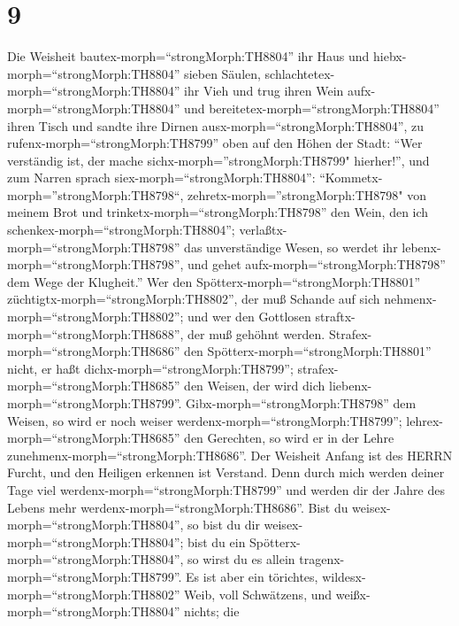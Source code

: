 \hypertarget{section-8}{%
\section{9}\label{section-8}}

 Die Weisheit bautex-morph=``strongMorph:TH8804'' ihr Haus
und hiebx-morph=``strongMorph:TH8804'' sieben Säulen, 
schlachtetex-morph=``strongMorph:TH8804'' ihr Vieh und trug ihren Wein
aufx-morph=``strongMorph:TH8804'' und
bereitetex-morph=``strongMorph:TH8804'' ihren Tisch  und
sandte ihre Dirnen ausx-morph=``strongMorph:TH8804'', zu
rufenx-morph=``strongMorph:TH8799'' oben auf den Höhen der Stadt:
 ``Wer verständig ist, der mache
sichx-morph=''strongMorph:TH8799" hierher!'', und zum Narren sprach
siex-morph=``strongMorph:TH8804'': 
``Kommetx-morph=''strongMorph:TH8798``,
zehretx-morph=''strongMorph:TH8798" von meinem Brot und
trinketx-morph=``strongMorph:TH8798'' den Wein, den ich
schenkex-morph=``strongMorph:TH8804''; 
verlaßtx-morph=``strongMorph:TH8798'' das unverständige Wesen, so werdet
ihr lebenx-morph=``strongMorph:TH8798'', und gehet
aufx-morph=``strongMorph:TH8798'' dem Wege der Klugheit.'' 
Wer den Spötterx-morph=``strongMorph:TH8801''
züchtigtx-morph=``strongMorph:TH8802'', der muß Schande auf sich
nehmenx-morph=``strongMorph:TH8802''; und wer den Gottlosen
straftx-morph=``strongMorph:TH8688'', der muß gehöhnt werden.
 Strafex-morph=``strongMorph:TH8686'' den
Spötterx-morph=``strongMorph:TH8801'' nicht, er haßt
dichx-morph=``strongMorph:TH8799''; strafex-morph=``strongMorph:TH8685''
den Weisen, der wird dich liebenx-morph=``strongMorph:TH8799''.
 Gibx-morph=``strongMorph:TH8798'' dem Weisen, so wird er
noch weiser werdenx-morph=``strongMorph:TH8799'';
lehrex-morph=``strongMorph:TH8685'' den Gerechten, so wird er in der
Lehre zunehmenx-morph=``strongMorph:TH8686''.  Der Weisheit
Anfang ist des HERRN Furcht, und den Heiligen erkennen ist Verstand.
 Denn durch mich werden deiner Tage viel
werdenx-morph=``strongMorph:TH8799'' und werden dir der Jahre des Lebens
mehr werdenx-morph=``strongMorph:TH8686''.  Bist du
weisex-morph=``strongMorph:TH8804'', so bist du dir
weisex-morph=``strongMorph:TH8804''; bist du ein
Spötterx-morph=``strongMorph:TH8804'', so wirst du es allein
tragenx-morph=``strongMorph:TH8799''.  Es ist aber ein
törichtes, wildesx-morph=``strongMorph:TH8802'' Weib, voll Schwätzens,
und weißx-morph=``strongMorph:TH8804'' nichts;  die
